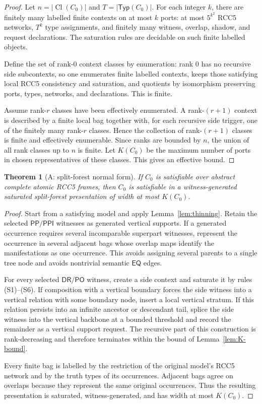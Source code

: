 \documentclass[11pt]{article}
\newtheorem{theorem}{Theorem}[section]
\newcommand{\EQ}{\mathsf{EQ}}
\newcommand{\PP}{\mathsf{PP}}
\newcommand{\PPI}{\mathsf{PPI}}
\newcommand{\PO}{\mathsf{PO}}
\newcommand{\DR}{\mathsf{DR}}
\newcommand{\Cl}{\operatorname{Cl}}
\newcommand{\Typ}{\mathsf{Typ}}
\begin{document}
\begin{proof}
Let $n=|\Cl(C_0)|$ and $T=|\Typ(C_0)|$.  For each integer $k$, there are finitely many labelled finite contexts on at most $k$ ports: at most $5^{k^2}$ RCC5 networks, $T^k$ type assignments, and finitely many witness, overlap, shadow, and request declarations.  The saturation rules are decidable on such finite labelled objects.

Define the set of rank-$0$ context classes by enumeration: rank $0$ has no recursive side subcontexts, so one enumerates finite labelled contexts, keeps those satisfying local RCC5 consistency and saturation, and quotients by isomorphism preserving ports, types, networks, and declarations.  This is finite.

Assume rank-$r$ classes have been effectively enumerated.  A rank-$(r+1)$ context is described by a finite local bag together with, for each recursive side trigger, one of the finitely many rank-$r$ classes.  Hence the collection of rank-$(r+1)$ classes is finite and effectively enumerable.  Since ranks are bounded by $n$, the union of all rank classes up to $n$ is finite.  Let $K(C_0)$ be the maximum number of ports in chosen representatives of these classes.  This gives an effective bound.
\end{proof}

\begin{theorem}[A: split-forest normal form]\label{thm:A}
If $C_0$ is satisfiable over abstract complete atomic RCC5 frames, then $C_0$ is satisfiable in a witness-generated saturated split-forest presentation of width at most $K(C_0)$.
\end{theorem}

\begin{proof}
Start from a satisfying model and apply Lemma~\ref{lem:thinning}.  Retain the selected $\PP/\PPI$ witnesses as generated vertical supports.  If a generated occurrence requires several incomparable superpart witnesses, represent the occurrence in several adjacent bags whose overlap maps identify the manifestations as one occurrence.  This avoids assigning several parents to a single tree node and avoids nontrivial semantic $\EQ$ edges.

For every selected $\DR/\PO$ witness, create a side context and saturate it by rules (S1)--(S6).  If composition with a vertical boundary forces the side witness into a vertical relation with some boundary node, insert a local vertical stratum.  If this relation persists into an infinite ancestor or descendant tail, splice the side witness into the vertical backbone at a bounded threshold and record the remainder as a vertical support request.  The recursive part of this construction is rank-decreasing and therefore terminates within the bound of Lemma~\ref{lem:K-bound}.

Every finite bag is labelled by the restriction of the original model's RCC5 network and by the truth types of its occurrences.  Adjacent bags agree on overlaps because they represent the same original occurrences.  Thus the resulting presentation is saturated, witness-generated, and has width at most $K(C_0)$.
\end{proof}
\end{document}
